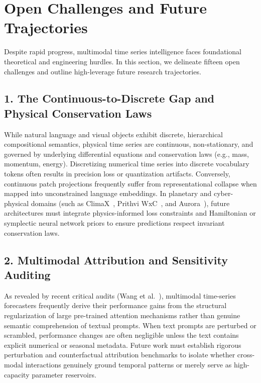 \section{Open Challenges and Future Trajectories}
\label{sec:outlook}

Despite rapid progress, multimodal time series intelligence faces foundational theoretical and engineering hurdles. In this section, we delineate fifteen open challenges and outline high-leverage future research trajectories.

\subsection{1. The Continuous-to-Discrete Gap and Physical Conservation Laws}
While natural language and visual objects exhibit discrete, hierarchical compositional semantics, physical time series are continuous, non-stationary, and governed by underlying differential equations and conservation laws (e.g., mass, momentum, energy). Discretizing numerical time series into discrete vocabulary tokens often results in precision loss or quantization artifacts. Conversely, continuous patch projections frequently suffer from representational collapse when mapped into unconstrained language embeddings. In planetary and cyber-physical domains (such as ClimaX~\cite{Nguyen2023ClimaX}, Prithvi WxC~\cite{Schmude2024PrithviWxC}, and Aurora~\cite{Bodnar2024Aurora}), future architectures must integrate physics-informed loss constraints and Hamiltonian or symplectic neural network priors to ensure predictions respect invariant conservation laws.

\subsection{2. Multimodal Attribution and Sensitivity Auditing}
As revealed by recent critical audits (Wang et al.~\cite{Wang2026AuditingText}), multimodal time-series forecasters frequently derive their performance gains from the structural regularization of large pre-trained attention mechanisms rather than genuine semantic comprehension of textual prompts. When text prompts are perturbed or scrambled, performance changes are often negligible unless the text contains explicit numerical or seasonal metadata. Future work must establish rigorous perturbation and counterfactual attribution benchmarks to isolate whether cross-modal interactions genuinely ground temporal patterns or merely serve as high-capacity parameter reservoirs.

